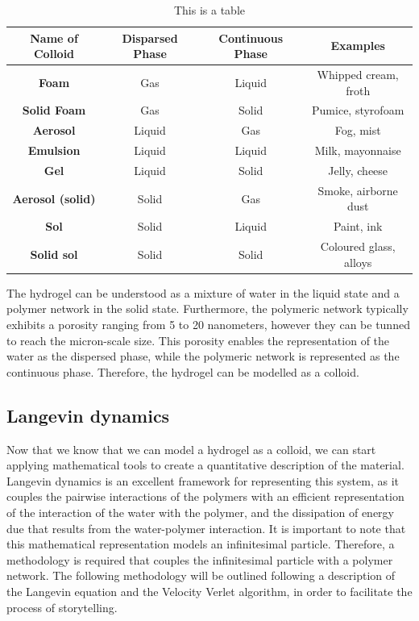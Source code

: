 \begin{table}[ht!]
\begin{tabular}{|c|c|c|c|}
\hline
\textbf{Name of Colloid} & \textbf{Disparsed Phase} & \textbf{Continuous Phase} & \textbf{Examples}      \\ \hline
\textbf{Foam}            & Gas                      & Liquid                    & Whipped cream, froth   \\ \hline
\textbf{Solid Foam}      & Gas                      & Solid                     & Pumice, styrofoam      \\ \hline
\textbf{Aerosol}         & Liquid                   & Gas                       & Fog, mist              \\ \hline
\textbf{Emulsion}        & Liquid                   & Liquid                    & Milk, mayonnaise       \\ \hline
\textbf{Gel}             & Liquid                   & Solid                     & Jelly, cheese          \\ \hline
\textbf{Aerosol (solid)} & Solid                    & Gas                       & Smoke, airborne dust   \\ \hline
\textbf{Sol}             & Solid                    & Liquid                    & Paint, ink             \\ \hline
\textbf{Solid sol}       & Solid                    & Solid                     & Coloured glass, alloys \\ \hline
\end{tabular}
\caption{This is a table}\label{tab:colloids}
\end{table}

The hydrogel can be understood as a mixture of water in the liquid state and a polymer network in the solid state.
Furthermore, the polymeric network typically exhibits a porosity ranging from 5 to 20 nanometers, however they can be tunned to reach the micron-scale size.
This porosity enables the representation of the water as the dispersed phase, while the polymeric network is represented as the continuous phase.
Therefore, the hydrogel can be modelled as a colloid.


\subsection{Langevin dynamics}

Now that we know that we can model a hydrogel as a colloid, we can start applying mathematical tools to create a quantitative description of the material.
Langevin dynamics is an excellent framework for representing this system, as it couples 
    the pairwise interactions of the polymers 
    with an efficient representation of the interaction of the water with the polymer, 
    and the dissipation of energy due that results from the water-polymer interaction.
It is important to note that this mathematical representation models an infinitesimal particle.
Therefore, a methodology is required that couples the infinitesimal particle with a polymer network.
The following methodology will be outlined following a description of the Langevin equation and the Velocity Verlet algorithm, in order to facilitate the process of storytelling.

